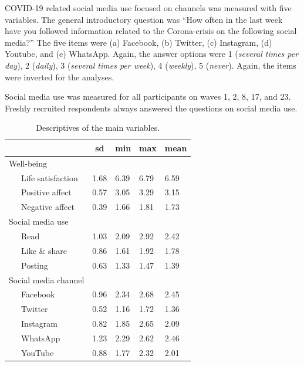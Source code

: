 \documentclass[
  english,
  man,mask,floatsintext]{apa6}
\begin{document}
COVID-19 related social media use focused on channels was measured with five variables.
The general introductory question was ``How often in the last week have you followed information related to the Corona-crisis on the following social media?''
The five items were (a) Facebook, (b) Twitter, (c) Instagram, (d) Youtube, and (e) WhatsApp.
Again, the answer options were 1 (\emph{several times per day}), 2 (\emph{daily}), 3 (\emph{several times per week}), 4 (\emph{weekly}), 5 (\emph{never}).
Again, the items were inverted for the analyses.

Social media use was measured for all participants on waves 1, 2, 8, 17, and 23.
Freshly recruited respondents always answered the questions on social media use.

\begin{table}[tbp]

\begin{center}
\begin{threeparttable}

\caption{\label{tab:descriptives}Descriptives of the main variables.}

\begin{tabular}{lllll}
\toprule
 & \multicolumn{1}{c}{sd} & \multicolumn{1}{c}{min} & \multicolumn{1}{c}{max} & \multicolumn{1}{c}{mean}\\
\midrule
Well-being &  &  &  & \\
\ \ \ Life satisfaction & 1.68 & 6.39 & 6.79 & 6.59\\
\ \ \ Positive affect & 0.57 & 3.05 & 3.29 & 3.15\\
\ \ \ Negative affect & 0.39 & 1.66 & 1.81 & 1.73\\
Social media use &  &  &  & \\
\ \ \ Read & 1.03 & 2.09 & 2.92 & 2.42\\
\ \ \ Like \& share & 0.86 & 1.61 & 1.92 & 1.78\\
\ \ \ Posting & 0.63 & 1.33 & 1.47 & 1.39\\
Social media channel &  &  &  & \\
\ \ \ Facebook & 0.96 & 2.34 & 2.68 & 2.45\\
\ \ \ Twitter & 0.52 & 1.16 & 1.72 & 1.36\\
\ \ \ Instagram & 0.82 & 1.85 & 2.65 & 2.09\\
\ \ \ WhatsApp & 1.23 & 2.29 & 2.62 & 2.46\\
\ \ \ YouTube & 0.88 & 1.77 & 2.32 & 2.01\\
\bottomrule
\end{tabular}

\end{threeparttable}
\end{center}

\end{table}
\end{document}
